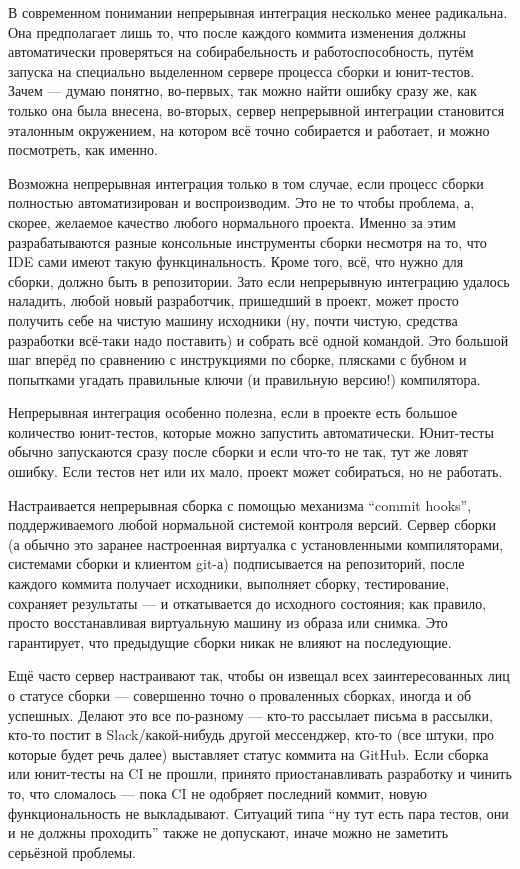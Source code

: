 \documentclass[a5paper]{article}
\begin{document}
В современном понимании непрерывная интеграция несколько менее радикальна. Она предполагает лишь то, что после каждого коммита изменения должны автоматически проверяться на собирабельность и работоспособность, путём запуска на специально выделенном сервере процесса сборки и юнит-тестов. Зачем --- думаю понятно, во-первых, так можно найти ошибку сразу же, как только она была внесена, во-вторых, сервер непрерывной интеграции становится эталонным окружением, на котором всё точно собирается и работает, и можно посмотреть, как именно. 

Возможна непрерывная интеграция только в том случае, если процесс сборки полностью автоматизирован и воспроизводим. Это не то чтобы проблема, а, скорее, желаемое качество любого нормального проекта. Именно за этим разрабатываются разные консольные инструменты сборки несмотря на то, что IDE сами имеют такую функцинальность. Кроме того, всё, что нужно для сборки, должно быть в репозитории. Зато если непрерывную интеграцию удалось наладить, любой новый разработчик, пришедший в проект, может просто получить себе на чистую машину исходники (ну, почти чистую, средства разработки всё-таки надо поставить) и собрать всё одной командой. Это большой шаг вперёд по сравнению с инструкциями по сборке, плясками с бубном и попытками угадать правильные ключи (и правильную версию!) компилятора.

Непрерывная интеграция особенно полезна, если в проекте есть большое количество юнит-тестов, которые можно запустить автоматически. Юнит-тесты обычно запускаются сразу после сборки и если что-то не так, тут же ловят ошибку. Если тестов нет или их мало, проект может собираться, но не работать.

Настраивается непрерывная сборка с помощью механизма ``commit hooks'', поддерживаемого любой нормальной системой контроля версий. Сервер сборки (а обычно это заранее настроенная виртуалка с установленными компиляторами, системами сборки и клиентом git-а) подписывается на репозиторий, после каждого коммита получает исходники, выполняет сборку, тестирование, сохраняет результаты --- и откатывается до исходного состояния; как правило, просто восстанавливая виртуальную машину из образа или снимка. Это гарантирует, что предыдущие сборки никак не влияют на последующие.

Ещё часто сервер настраивают так, чтобы он извещал всех заинтересованных лиц о статусе сборки --- совершенно точно о проваленных сборках, иногда и об успешных. Делают это все по-разному --- кто-то рассылает письма в рассылки, кто-то постит в Slack/какой-нибудь другой мессенджер, кто-то (все штуки, про которые будет речь далее) выставляет статус коммита на GitHub. Если сборка или юнит-тесты на CI не прошли, принято приостанавливать разработку и чинить то, что сломалось --- пока CI не одобряет последний коммит, новую функциональность не выкладывают. Ситуаций типа ``ну тут есть пара тестов, они и не должны проходить'' также не допускают, иначе можно не заметить серьёзной проблемы.
\end{document}

